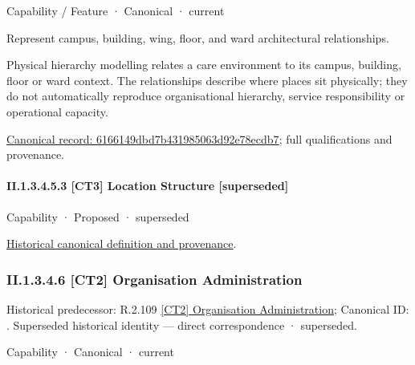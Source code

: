 \label{element:6166149dbd7b431985063d92e78ecdb7}
{\small Capability / Feature · Canonical · current}\par

Represent campus, building, wing, floor, and ward architectural relationships.



Physical hierarchy modelling relates a care environment to its campus, building, floor or ward context. The relationships describe where places sit physically; they do not automatically reproduce organisational hierarchy, service responsibility or operational capacity.


{\footnotesize \href{../../../../../../../continuum/strategy/capability/feature/6166149dbd7b431985063d92e78ecdb7.md}{Canonical record: 6166149dbd7b431985063d92e78ecdb7}; full qualifications and provenance.}\par
\paragraph*{II.1.3.4.5.3 [CT3] Location Structure [superseded]}
\label{navigation:II.1.3.4.5.3}

\label{element:2436c87195334daf85ed4e2de4ec4bd5}
{\small Capability · Proposed · superseded}\par
\href{../../../../../../../continuum/strategy/capability/2436c87195334daf85ed4e2de4ec4bd5.md}{Historical canonical definition and provenance}.\par
\subsubsection*{II.1.3.4.6 [CT2] Organisation Administration}
\label{navigation:II.1.3.4.6}

{\small Historical predecessor: R.2.109 \hyperref[element:1b0eacfbb27d4631a24f9279dab6681d]{[CT2] Organisation Administration}; Canonical ID: \texttt{}. Superseded historical identity — direct correspondence · superseded.}\par
\label{element:14fbdc5ce3dd4c2092c5397dab3ed743}
{\small Capability · Canonical · current}\par

